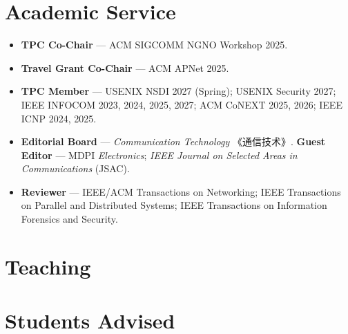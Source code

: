 \documentclass[11pt]{article}
\newcommand{\cn}[1]{#1}
\begin{document}
\section{Academic Service}
\begin{itemize}
  \item \textbf{TPC Co-Chair} --- ACM SIGCOMM NGNO Workshop 2025.
  \item \textbf{Travel Grant Co-Chair} --- ACM APNet 2025.
  \item \textbf{TPC Member} --- USENIX NSDI 2027 (Spring); USENIX Security 2027;
        IEEE INFOCOM 2023, 2024, 2025, 2027; ACM CoNEXT 2025, 2026;
        IEEE ICNP 2024, 2025.
  \item \textbf{Editorial Board} --- \emph{Communication Technology}
        \cn{《通信技术》}. \textbf{Guest Editor} --- MDPI \emph{Electronics};
        \emph{IEEE Journal on Selected Areas in Communications} (JSAC).
  \item \textbf{Reviewer} --- IEEE/ACM Transactions on Networking; IEEE Transactions
        on Parallel and Distributed Systems; IEEE Transactions on Information
        Forensics and Security.
\end{itemize}

\section{Teaching}
\begin{kvlist}
\end{kvlist}

\section{Students Advised}
\end{document}
